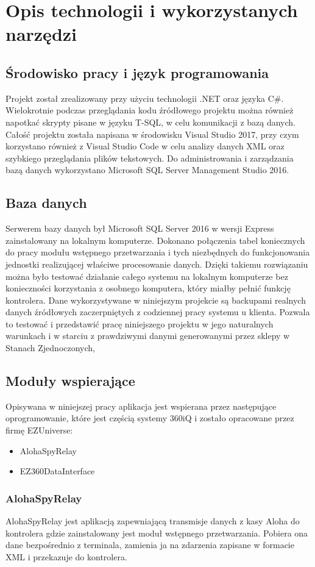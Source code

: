 \documentclass[a4paper]{book}
\begin{document}
\section{Opis technologii i wykorzystanych narzędzi}
\subsection{Środowisko pracy i język programowania}
Projekt został zrealizowany przy użyciu technologii .NET oraz języka C\#.
Wielokrotnie podczas przeglądania kodu źródłowego projektu można również napotkać skrypty pisane w języku T-SQL, w celu komunikacji z bazą danych.
Całość projektu została napisana w środowisku Visual Studio 2017, przy czym korzystano również z Visual Studio Code w celu analizy danych XML oraz szybkiego przeglądania plików tekstowych.
Do administrowania i zarządzania bazą danych wykorzystano Microsoft SQL Server Management Studio 2016. 
\subsection{Baza danych}
Serwerem bazy danych był Microsoft SQL Server 2016 w wersji Express zainstalowany na lokalnym komputerze. Dokonano połączenia tabel koniecznych do pracy modułu wstępnego przetwarzania i tych niezbędnych do funkcjonowania jednostki realizującej właściwe procesowanie danych.
Dzięki takiemu rozwiązaniu można było testować działanie całego systemu na lokalnym komputerze bez konieczności korzystania z osobnego komputera, który miałby pełnić funkcję kontrolera.
Dane wykorzystywane w niniejszym projekcie są backupami realnych danych źródłowych zaczerpniętych z codziennej pracy systemu u klienta. Pozwala to testować i przedstawić pracę niniejszego projektu w jego naturalnych warunkach i w starciu z prawdziwymi danymi generowanymi przez sklepy w Stanach Zjednoczonych,
\subsection{Moduły wspierające}
Opisywana w niniejszej pracy aplikacja jest wspierana przez następujące oprogramowanie, które jest częścią systemy 360iQ i zostało opracowane przez firmę EZUniverse:
 \begin{itemize}
 	\item AlohaSpyRelay
 	\item EZ360DataInterface
 \end{itemize}
\subsubsection{AlohaSpyRelay}
AlohaSpyRelay jest aplikacją zapewniającą transmisje danych z kasy Aloha do kontrolera gdzie zainstalowany jest moduł wstępnego przetwarzania. Pobiera ona dane bezpośrednio z terminala, zamienia ja na zdarzenia zapisane w formacie XML i przekazuje do kontrolera.
\end{document}
